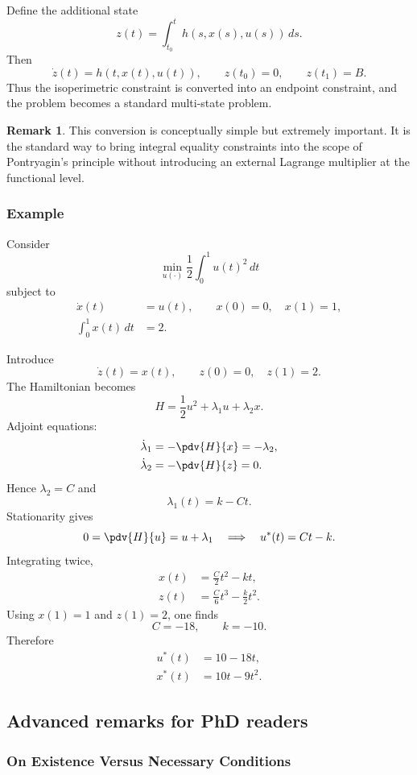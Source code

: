 \documentclass[11pt]{article}
\theoremstyle{definition}
\newtheorem{remark}{Remark}
\begin{document}
Define the additional state
\[
z(t)=\int_{t_0}^{t} h(s,x(s),u(s))\,ds.
\]
Then
\[
\dot{z}(t)=h(t,x(t),u(t)), \qquad z(t_0)=0,\qquad z(t_1)=B.
\]
Thus the isoperimetric constraint is converted into an endpoint constraint, and the problem becomes a standard multi-state problem.

\begin{remark}
This conversion is conceptually simple but extremely important. It is the standard way to bring integral equality constraints into the scope of Pontryagin’s principle without introducing an external Lagrange multiplier at the functional level.
\end{remark}

\subsubsection{Example}

Consider
\[
\min_{u(\cdot)} \frac{1}{2}\int_0^1 u(t)^2\,dt
\]
subject to
\begin{align}
\dot{x}(t)&=u(t),\qquad x(0)=0,\quad x(1)=1,\\
\int_0^1 x(t)\,dt&=2.
\end{align}

Introduce
\[
\dot{z}(t)=x(t),\qquad z(0)=0,\quad z(1)=2.
\]
The Hamiltonian becomes
\[
H=\frac{1}{2}u^2+\lambda_1 u+\lambda_2 x.
\]
Adjoint equations:
\begin{align}
\dot{\lambda}_1 &= -\pdv{H}{x}=-\lambda_2,\\
\dot{\lambda}_2 &= -\pdv{H}{z}=0.
\end{align}
Hence $\lambda_2=C$ and
\[
\lambda_1(t)=k-Ct.
\]
Stationarity gives
\[
0=\pdv{H}{u}=u+\lambda_1
\quad \Longrightarrow \quad
u^*(t)=Ct-k.
\]
Integrating twice,
\begin{align}
x(t)&=\frac{C}{2}t^2-kt,\\
z(t)&=\frac{C}{6}t^3-\frac{k}{2}t^2.
\end{align}
Using $x(1)=1$ and $z(1)=2$, one finds
\[
C=-18,\qquad k=-10.
\]
Therefore
\begin{align}
u^*(t)&=10-18t,\\
x^*(t)&=10t-9t^2.
\end{align}

\subsection{Advanced remarks for PhD readers}

\subsubsection{On Existence Versus Necessary Conditions}
\end{document}
